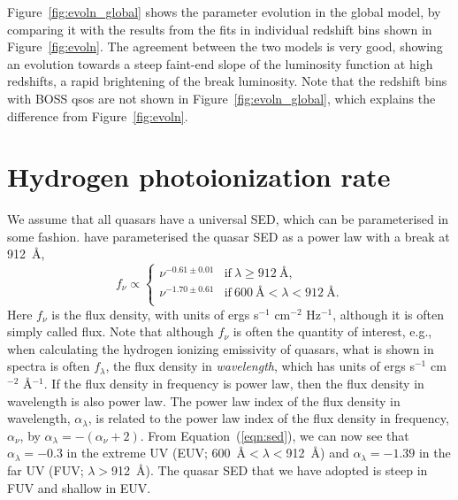 \documentclass[a4paper,fleqn,usenatbib]{mnras}
\begin{document}
Figure~\ref{fig:evoln_global} shows the parameter evolution in the
global model, by comparing it with the results from the fits in
individual redshift bins shown in Figure~\ref{fig:evoln}.  The
agreement between the two models is very good, showing an evolution
towards a steep faint-end slope of the luminosity function at high
redshifts, a rapid brightening of the break luminosity.  Note that the
redshift bins with BOSS qsos are not shown in
Figure~\ref{fig:evoln_global}, which explains the difference from
Figure~\ref{fig:evoln}.

\section{Hydrogen photoionization rate}

We assume that all quasars have a universal SED, which can be
parameterised in some fashion.  \citet{2015MNRAS.449.4204L} have
parameterised the quasar SED as a power law with a break at 912~{\AA},
\begin{equation}
f_\nu\propto\begin{cases}
               \nu^{-0.61\pm 0.01} & \text{if}~\lambda\geq 912~\text{\AA},\\
               \nu^{-1.70\pm 0.61} & \text{if}~600~\text{\AA}<\lambda<912~\text{\AA}.\\                
               \end{cases}
\label{eqn:sed}
\end{equation}
Here $f_\nu$ is the flux density, with units of ergs s$^{-1}$
cm$^{-2}$ Hz$^{-1}$, although it is often simply called flux.  Note
that although $f_\nu$ is often the quantity of interest, e.g., when
calculating the hydrogen ionizing emissivity of quasars, what is shown
in spectra is often $f_\lambda$, the flux density
in \emph{wavelength}, which has units of ergs s$^{-1}$
cm$^{-2}$ \AA$^{-1}$.  If the flux density in frequency is power law,
then the flux density in wavelength is also power law.  The power law
index of the flux density in wavelength, $\alpha_\lambda$, is related
to the power law index of the flux density in frequency, $\alpha_\nu$,
by $\alpha_\lambda=-(\alpha_\nu+2)$.  From Equation~(\ref{eqn:sed}),
we can now see that $\alpha_\lambda=-0.3$ in the extreme UV (EUV;
600~{\AA}$<\lambda<$912~{\AA}) and $\alpha_\lambda=-1.39$ in the far
UV (FUV; $\lambda>$912~{\AA}).  The quasar SED that we have adopted is
steep in FUV and shallow in EUV.
\end{document}
